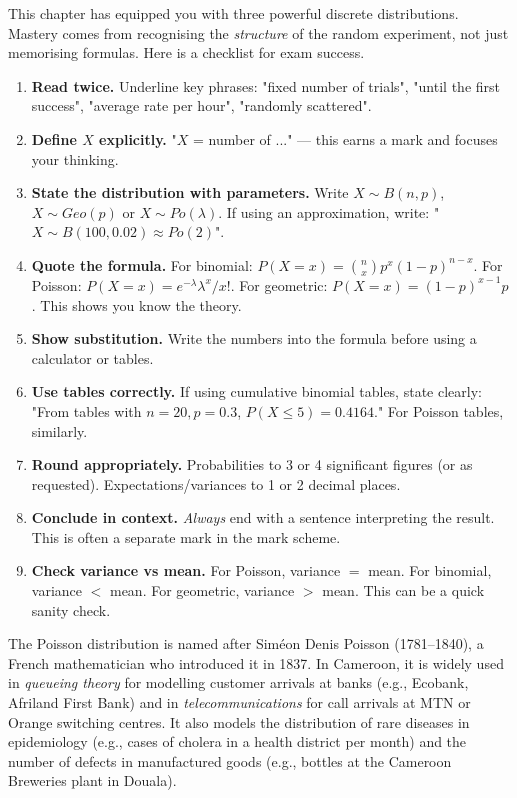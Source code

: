 \documentclass[11pt]{article}
\newcounter{popsec}
\newcounter{popsub}
\newcommand{\courssub}[1]{%
  \stepcounter{popsub}%
  \par\vspace{9pt}\noindent{\popxbold\fontsize{11.5}{13}\selectfont\color{popink}{\color{poporange}\thepopsec.\thepopsub}\hspace{6pt}#1}\par\nopagebreak\vspace{4pt}
}
\begin{document}
\courssub{Chapter Synthesis and GCE Exam Technique}

This chapter has equipped you with three powerful discrete distributions. Mastery comes from recognising the \emph{structure} of the random experiment, not just memorising formulas. Here is a checklist for exam success.

\begin{methode}
\begin{enumerate}
    \item \textbf{Read twice.} Underline key phrases: "fixed number of trials", "until the first success", "average rate per hour", "randomly scattered".
    \item \textbf{Define $X$ explicitly.} "$X$ = number of ..." --- this earns a mark and focuses your thinking.
    \item \textbf{State the distribution with parameters.} Write $X \sim B(n,p)$, $X \sim Geo(p)$ or $X \sim Po(\lambda)$. If using an approximation, write: "$X \sim B(100,0.02) \approx Po(2)$".
    \item \textbf{Quote the formula.} For binomial: $P(X=x)=\binom{n}{x}p^x(1-p)^{n-x}$. For Poisson: $P(X=x)=e^{-\lambda}\lambda^x/x!$. For geometric: $P(X=x)=(1-p)^{x-1}p$. This shows you know the theory.
    \item \textbf{Show substitution.} Write the numbers into the formula before using a calculator or tables.
    \item \textbf{Use tables correctly.} If using cumulative binomial tables, state clearly: "From tables with $n=20, p=0.3$, $P(X \le 5) = 0.4164$." For Poisson tables, similarly.
    \item \textbf{Round appropriately.} Probabilities to 3 or 4 significant figures (or as requested). Expectations/variances to 1 or 2 decimal places.
    \item \textbf{Conclude in context.} \emph{Always} end with a sentence interpreting the result. This is often a separate mark in the mark scheme.
    \item \textbf{Check variance vs mean.} For Poisson, variance $=$ mean. For binomial, variance $<$ mean. For geometric, variance $>$ mean. This can be a quick sanity check.
\end{enumerate}
\end{methode}

\begin{savaistu}
The Poisson distribution is named after Siméon Denis Poisson (1781--1840), a French mathematician who introduced it in 1837. In Cameroon, it is widely used in \emph{queueing theory} for modelling customer arrivals at banks (e.g., Ecobank, Afriland First Bank) and in \emph{telecommunications} for call arrivals at MTN or Orange switching centres. It also models the distribution of rare diseases in epidemiology (e.g., cases of cholera in a health district per month) and the number of defects in manufactured goods (e.g., bottles at the Cameroon Breweries plant in Douala).
\end{savaistu}
\end{document}
